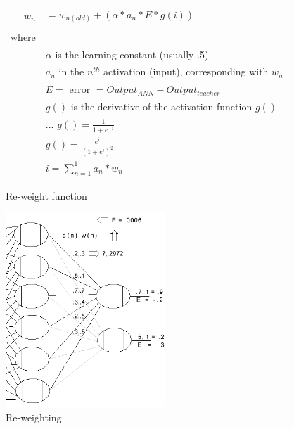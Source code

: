 \documentclass[12pt]{article}
\begin{document}
\begin{figure}[h]
        \begin{center}
		\begin{tabular}{r l}
			$w_{n}$		&	$ =  w_{n ( old )} + ( \alpha * a_n * E * \dot g(i) )$	\\
						&										\\
			where		&										\\
						&	$\alpha$ is the learning constant (usually .5)		\\
						&	$a_n$ in the $n^{th}$ activation (input), corresponding with $w_n$ \\
						&	$ E  = $ error  $ = Output_{ANN} - Output_{teacher} $ \\
						&	$ \dot g() $ is the derivative of the activation function $ g() $ \\
						&	... $ g() = \frac{1}{1 + e^{-i}} $				\\
						&	$ \dot g() = \frac{e^{i}}{(1 + e^{i})^2} $			\\
						&	$i  = \sum_{n=1}^1 a_n * w_n$ 	\\
		\end{tabular}
                	\caption{Re-weight function}
                	\label{weight_func}
        \end{center}
\end{figure}

\pagebreak

\begin{figure}[h]
        \begin{center}
		\includegraphics[width=60mm]{report_images/feedforward_hidden02.png}
                	\caption{Re-weighting}
                	\label{feedforward_hidden02}
        \end{center}
\end{figure}
\end{document}
